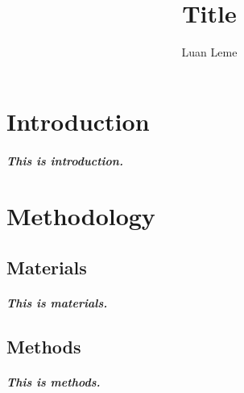 \documentclass[11pt, a4paper]{article}
\title{Title}
\author{Luan Leme}
\begin{document}
\maketitle

\chapter{Introduction}

\paragraph{This is introduction.}

\chapter{Methodology}

\section{Materials}

\paragraph{This is materials.}

\section{Methods}

\paragraph{This is methods.}
\end{document}
